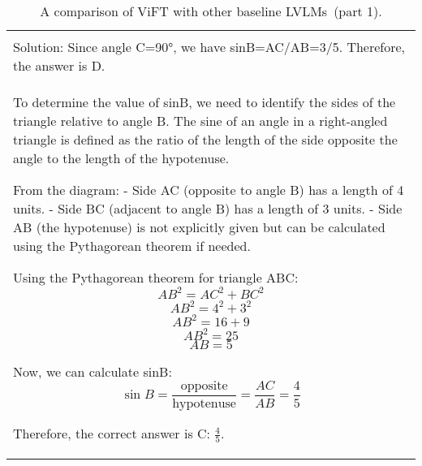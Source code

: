 \begin{table*}[htbp]
    \ContinuedFloat
    \begin{tabular}{p{14cm}}
        \centering

                \begin{tcolorbox}[colback=gray!5, colframe=gray!40, sharp corners, width=\linewidth, boxrule=0.5mm]
        \small
        \textbf{LLaVA-OneVision-7B:}
        \\
Solution: Since angle C=90°, we have sinB=AC/AB=3/5.
Therefore, the answer is D.


\end{tcolorbox}
        \begin{tcolorbox}[colback=gray!5, colframe=gray!40, sharp corners, width=\linewidth, boxrule=0.5mm]
        \small
        \textbf{ViFT-7B:}
        \\
To determine the value of sinB, we need to identify the sides of the triangle relative to angle B. The sine of an angle in a right-angled triangle is defined as the ratio of the length of the side opposite the angle to the length of the hypotenuse.

From the diagram:
- Side AC (opposite to angle B) has a length of 4 units.
- Side BC (adjacent to angle B) has a length of 3 units.
- Side AB (the hypotenuse) is not explicitly given but can be calculated using the Pythagorean theorem if needed.

Using the Pythagorean theorem for triangle ABC:
\[ AB^2 = AC^2 + BC^2 \]
\[ AB^2 = 4^2 + 3^2 \]
\[ AB^2 = 16 + 9 \]
\[ AB^2 = 25 \]
\[ AB = 5 \]

Now, we can calculate sinB:
\[ \sin B = \frac{\text{opposite}}{\text{hypotenuse}} = \frac{AC}{AB} = \frac{4}{5} \]

Therefore, the correct answer is C: \(\frac{4}{5}\).

\end{tcolorbox}
\end{tabular}
\caption{A comparison of ViFT with other baseline LVLMs~(part 1).}
\end{table*}



